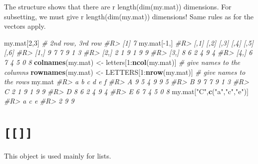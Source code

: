 \documentclass[]{book}
\newenvironment{Shaded}{}{}
\newcommand{\CommentTok}[1]{\textcolor[rgb]{0.38,0.63,0.69}{\textit{#1}}}
\newcommand{\DecValTok}[1]{\textcolor[rgb]{0.25,0.63,0.44}{#1}}
\newcommand{\KeywordTok}[1]{\textcolor[rgb]{0.00,0.44,0.13}{\textbf{#1}}}
\newcommand{\NormalTok}[1]{#1}
\newcommand{\OperatorTok}[1]{\textcolor[rgb]{0.40,0.40,0.40}{#1}}
\newcommand{\StringTok}[1]{\textcolor[rgb]{0.25,0.44,0.63}{#1}}
\theoremstyle{definition}
\theoremstyle{definition}
\theoremstyle{definition}
\theoremstyle{remark}
\begin{document}
The structure shows that there are r length(dim(my.mat)) dimensions. For
subsetting, we must give r length(dim(my.mat)) dimensions! Same rules as
for the vectors apply.

\begin{Shaded}
\begin{Highlighting}[]
\NormalTok{my.mat[}\DecValTok{2}\NormalTok{,}\DecValTok{3}\NormalTok{] }\CommentTok{# 2nd row, 3rd row}
\CommentTok{#R> [1] 7}
\NormalTok{my.mat[}\OperatorTok{-}\DecValTok{1}\NormalTok{,]}
\CommentTok{#R>      [,1] [,2] [,3] [,4] [,5] [,6]}
\CommentTok{#R> [1,]    9    7    7    9    1    3}
\CommentTok{#R> [2,]    2    1    9    1    9    9}
\CommentTok{#R> [3,]    8    6    2    4    9    4}
\CommentTok{#R> [4,]    6    7    4    5    0    8}
\KeywordTok{colnames}\NormalTok{(my.mat) <-}\StringTok{ }\NormalTok{letters[}\DecValTok{1}\OperatorTok{:}\KeywordTok{ncol}\NormalTok{(my.mat)] }\CommentTok{# give names to the columns}
\KeywordTok{rownames}\NormalTok{(my.mat) <-}\StringTok{ }\NormalTok{LETTERS[}\DecValTok{1}\OperatorTok{:}\KeywordTok{nrow}\NormalTok{(my.mat)] }\CommentTok{# give names to the rows}
\NormalTok{my.mat}
\CommentTok{#R>   a b c d e f}
\CommentTok{#R> A 9 5 4 9 9 5}
\CommentTok{#R> B 9 7 7 9 1 3}
\CommentTok{#R> C 2 1 9 1 9 9}
\CommentTok{#R> D 8 6 2 4 9 4}
\CommentTok{#R> E 6 7 4 5 0 8}
\NormalTok{my.mat[}\StringTok{"C"}\NormalTok{,}\KeywordTok{c}\NormalTok{(}\StringTok{"a"}\NormalTok{,}\StringTok{"c"}\NormalTok{,}\StringTok{"e"}\NormalTok{)]}
\CommentTok{#R> a c e }
\CommentTok{#R> 2 9 9}
\end{Highlighting}
\end{Shaded}

\hypertarget{section-1}{%
\section{\texorpdfstring{\texttt{{[}{[}{]}{]}}}{{[}{[}{]}{]}}}\label{section-1}}

This object is used mainly for lists.
\end{document}
